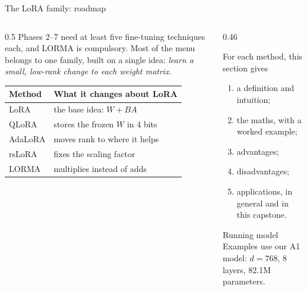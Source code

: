 \documentclass[aspectratio=169,11pt]{beamer}
\begin{document}
\begin{frame}{The LoRA family: roadmap}
  \begin{columns}[T]
    \begin{column}{0.5\textwidth}
      \small
      Phases 2--7 need at least five fine-tuning techniques each, and \alert{LORMA is compulsory}.
      Most of the menu belongs to one family, built on a single idea: \emph{learn a small, low-rank change to each weight matrix}.
      \vspace{2mm}

      \begin{tabular}{@{}ll@{}}
        \toprule
        Method & What it changes about LoRA\\
        \midrule
        LoRA & the base idea: $W+BA$\\
        QLoRA & stores the frozen $W$ in 4 bits\\
        AdaLoRA & moves rank to where it helps\\
        rsLoRA & fixes the scaling factor\\
        LORMA & multiplies instead of adds\\
        \bottomrule
      \end{tabular}
    \end{column}
    \begin{column}{0.46\textwidth}
      \begin{block}{For each method, this section gives}
        \small
        \begin{enumerate}
          \item a definition and intuition;
          \item the maths, with a worked example;
          \item advantages;
          \item disadvantages;
          \item applications, in general and in this capstone.
        \end{enumerate}
      \end{block}
      \begin{exampleblock}{Running model}
        \small
        Examples use our A1 model: $d=768$, 8 layers, 82.1M parameters.
      \end{exampleblock}
    \end{column}
  \end{columns}
\end{frame}
\end{document}
